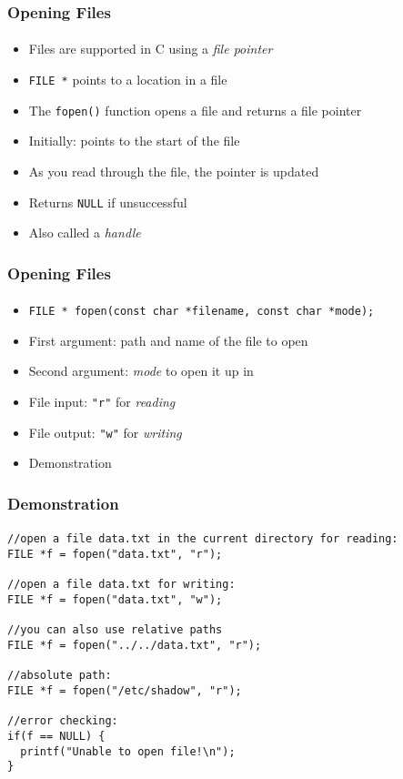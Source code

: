 \documentclass[]{beamer}
\begin{document}
\begin{frame}[fragile]
  \frametitle{Opening Files}
  \framesubtitle{}

\begin{itemize}[<+->]
  \item Files are supported in C using a \emph{file pointer}
  \item \texttt{FILE *} points to a location in a file
  \item The \texttt{fopen()} function opens a file and returns a file pointer
  \item Initially: points to the start of the file
  \item As you read through the file, the pointer is updated
  \item Returns \texttt{NULL} if unsuccessful
  \item Also called a \emph{handle}
\end{itemize}

\end{frame}

\begin{frame}[fragile]
  \frametitle{Opening Files}
  \framesubtitle{}

\begin{itemize}[<+->]
  \item \texttt{FILE * fopen(const char *filename, const char *mode);} 
  \item First argument: path and name of the file to open
  \item Second argument: \emph{mode} to open it up in
  \item File input: \texttt{"r"} for \emph{reading}
  \item File output: \texttt{"w"} for \emph{writing}
  \item Demonstration  
\end{itemize}

\end{frame}

\begin{frame}[fragile]
  \frametitle{Demonstration}
  \framesubtitle{}

\begin{verbatim}
//open a file data.txt in the current directory for reading:
FILE *f = fopen("data.txt", "r");

//open a file data.txt for writing:
FILE *f = fopen("data.txt", "w");

//you can also use relative paths
FILE *f = fopen("../../data.txt", "r");

//absolute path:
FILE *f = fopen("/etc/shadow", "r");

//error checking: 
if(f == NULL) {
  printf("Unable to open file!\n");
}
\end{verbatim}

\end{frame}
\end{document}
